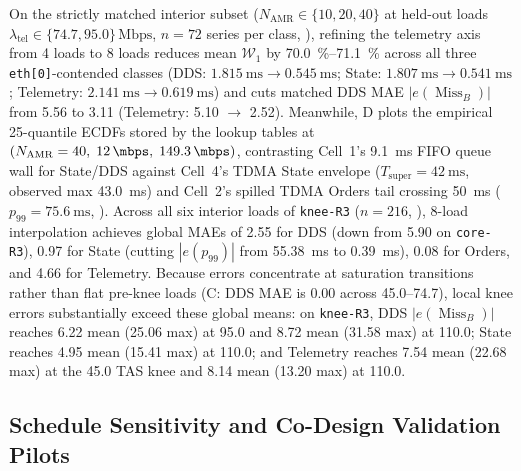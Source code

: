 \documentclass[11pt,a4paper]{article}
\newcommand{\Namr}{\ensuremath{N_{\mathrm{AMR}}}}
\newcommand{\ltel}{\ensuremath{\lambda_{\mathrm{tel}}}}
\newcommand{\Tsuper}{\ensuremath{T_{\mathrm{super}}}}
\newcommand{\MissB}{\ensuremath{\operatorname{Miss}_B}}
\newcommand{\Wone}{\ensuremath{\mathcal{W}_1}}
\begin{document}
On the strictly matched interior subset ($\Namr \in \{10, 20, 40\}$ at held-out loads $\ltel \in \{74.7, 95.0\}\,\text{Mbps}$, $n=72$ series per class, ), refining the telemetry axis from 4 loads to 8 loads reduces mean $\Wone$ by \qtyrange{70.0}{71.1}{\percent} across all three \texttt{eth[0]}-contended classes (DDS: $\qty{1.815}{\milli\second} \to \qty{0.545}{\milli\second}$; State: $\qty{1.807}{\milli\second} \to \qty{0.541}{\milli\second}$; Telemetry: $\qty{2.141}{\milli\second} \to \qty{0.619}{\milli\second}$) and cuts matched DDS MAE $|e(\MissB)|$ from \qty{5.56}{\pp} to \qty{3.11}{\pp} (Telemetry: \qty{5.10}{\pp} $\to$ \qty{2.52}{\pp}). Meanwhile, D plots the empirical 25-quantile ECDFs stored by the lookup tables at $(\Namr=40,\; \qty{12}{\mbps},\; \qty{149.3}{\mbps})$, contrasting Cell~1's \qty{9.1}{\milli\second} FIFO queue wall for State/DDS against Cell~4's TDMA State envelope ($\Tsuper=\qty{42}{\milli\second}$, observed max \qty{43.0}{\milli\second}) and Cell~2's spilled TDMA Orders tail crossing \qty{50}{\milli\second} ($p_{99} = \qty{75.6}{\milli\second}$, ). Across all six interior loads of \texttt{knee-R3} ($n=216$, ), 8-load interpolation achieves global MAEs of \qty{2.55}{\pp} for DDS (down from \qty{5.90}{\pp} on \texttt{core-R3}), \qty{0.97}{\pp} for State (cutting $|e(p_{99})|$ from \qty{55.38}{\milli\second} to \qty{0.39}{\milli\second}), \qty{0.08}{\pp} for Orders, and \qty{4.66}{\pp} for Telemetry. Because errors concentrate at saturation transitions rather than flat pre-knee loads (C: DDS MAE is \qty{0.00}{\pp} across \qtyrange{45.0}{74.7}{\mbps}), local knee errors substantially exceed these global means: on \texttt{knee-R3}, DDS $|e(\MissB)|$ reaches \qty{6.22}{\pp} mean (\qty{25.06}{\pp} max) at \qty{95.0}{\mbps} and \qty{8.72}{\pp} mean (\qty{31.58}{\pp} max) at \qty{110.0}{\mbps}; State reaches \qty{4.95}{\pp} mean (\qty{15.41}{\pp} max) at \qty{110.0}{\mbps}; and Telemetry reaches \qty{7.54}{\pp} mean (\qty{22.68}{\pp} max) at the \qty{45.0}{\mbps} TAS knee and \qty{8.14}{\pp} mean (\qty{13.20}{\pp} max) at \qty{110.0}{\mbps}.

\subsection{Schedule Sensitivity and Co-Design Validation Pilots}
\label{sec:codesign_pilot}
\end{document}
